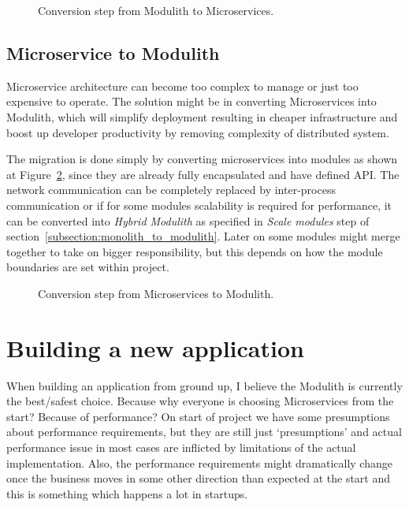 \begin{figure}
    \centering
    
    \caption{Conversion step from Modulith to Microservices.\label{fig:modulith_to_microservices_steps}}
\end{figure}


\subsection{Microservice to Modulith}
Microservice architecture can become too complex to manage or just too expensive to operate. The solution might be in converting Microservices into Modulith, which will simplify deployment resulting in cheaper infrastructure and boost up developer productivity by removing complexity of distributed system.

The migration is done simply by converting microservices into modules as shown at Figure~\ref{fig:microservices_to_modulith_steps}, since they are already fully encapsulated and have defined API. The network communication can be completely replaced by inter-process communication or if for some modules scalability is required for performance, it can be converted into \textit{Hybrid Modulith} as specified in \textit{Scale modules} step of section~\ref{subsection:monolith_to_modulith}. Later on some modules might merge together to take on bigger responsibility, but this depends on how the module boundaries are set within project.

\begin{figure}
    \centering
    
    \caption{Conversion step from Microservices to Modulith.\label{fig:microservices_to_modulith_steps}}
\end{figure}


\section{Building a new application}
When building an application from ground up, I believe the Modulith is currently the best/safest choice. Because why everyone is choosing Microservices from the start? Because of performance? On start of project we have some presumptions about performance requirements, but they are still just `presumptions' and actual performance issue in most cases are inflicted by limitations of the actual implementation. Also, the performance requirements might dramatically change once the business moves in some other direction than expected at the start and this is something which happens a lot in startups.

